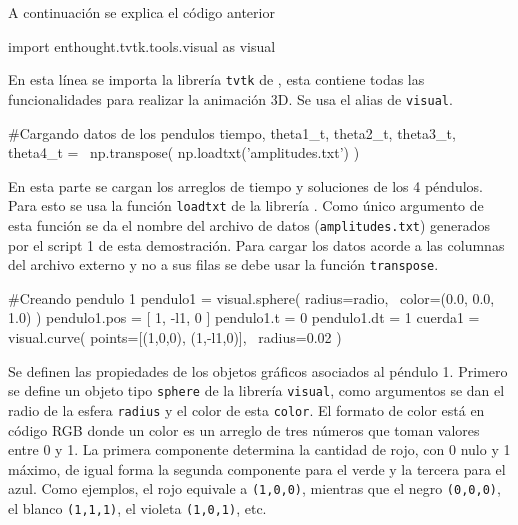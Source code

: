 A continuación se explica el código anterior


\begin{listing}[style=python, numbers = none]
import enthought.tvtk.tools.visual as visual
\end{listing}
En esta línea se importa la librería \texttt{tvtk} de \mayavi, esta 
contiene todas las funcionalidades para realizar la animación 3D. Se usa el
alias de \texttt{visual}.


\begin{listing}[style=python, numbers = none]
#Cargando datos de los pendulos
tiempo, theta1_t, theta2_t, theta3_t, theta4_t = \
np.transpose( np.loadtxt('amplitudes.txt') )
\end{listing}
En esta parte se cargan los arreglos de tiempo y soluciones de los 4 
péndulos. Para esto se usa la función \texttt{loadtxt} de la librería 
\numpy. Como único argumento de esta función se da el nombre del archivo
de datos (\texttt{amplitudes.txt}) generados por el script 1 de esta 
demostración. Para cargar los datos acorde a las columnas del archivo 
externo y no a sus filas se debe usar la función \texttt{transpose}.


\begin{listing}[style=python, numbers = none]
#Creando pendulo 1
pendulo1 = visual.sphere( radius=radio, \
color=(0.0, 0.0, 1.0) )
pendulo1.pos = [ 1, -l1, 0 ]
pendulo1.t = 0
pendulo1.dt = 1
cuerda1 = visual.curve( points=[(1,0,0), (1,-l1,0)], \
radius=0.02 )
\end{listing}
Se definen las propiedades de los objetos gráficos asociados al péndulo 1.
Primero se define un objeto tipo \texttt{sphere} de la librería 
\texttt{visual}, como argumentos se dan el radio de la esfera \texttt{radius}
y el color de esta \texttt{color}. El formato de color está en código RGB
donde un color es un arreglo de tres números que toman valores entre 
0 y 1. La primera componente determina la cantidad de rojo, con 0 nulo y 1
máximo, de igual forma la segunda componente para el verde y la tercera para
el azul. Como ejemplos, el rojo equivale a \texttt{(1,0,0)}, mientras que
el negro \texttt{(0,0,0)}, el blanco \texttt{(1,1,1)}, el violeta 
\texttt{(1,0,1)}, etc. 


